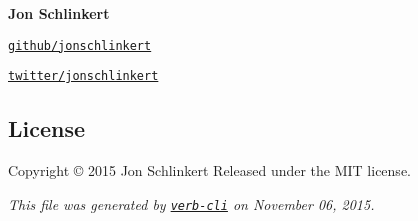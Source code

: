 {\bfseries Jon Schlinkert}


\begin{DoxyItemize}
\item \href{https://github.com/jonschlinkert}{\tt github/jonschlinkert}
\item \href{http://twitter.com/jonschlinkert}{\tt twitter/jonschlinkert}
\end{DoxyItemize}

\subsection*{License}

Copyright © 2015 Jon Schlinkert Released under the M\+IT license.





{\itshape This file was generated by \href{https://github.com/assemble/verb-cli}{\tt verb-\/cli} on November 06, 2015.} 